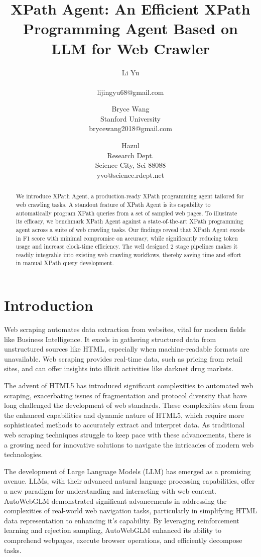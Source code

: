 \documentclass[a4paper]{article}
\title{XPath Agent: An Efficient XPath Programming Agent Based on LLM for Web Crawler}
\author{
Li Yu \\ \\ lijingyu68@gmail.com
\and
Bryce Wang \\ Stanford University  \\ brycewang2018@gmail.com
\and
Hazul \\ Research Dept.\\
                Science City, Sci 88088 \\ yvo@science.rdept.net
}
\begin{document}
\maketitle

\begin{abstract}
We introduce XPath Agent, a production-ready XPath programming agent tailored for web crawling tasks. A standout feature of XPath Agent is its capability to automatically program XPath queries from a set of sampled web pages. To illustrate its efficacy, we benchmark XPath Agent against a state-of-the-art XPath programming agent across a suite of web crawling tasks. Our findings reveal that XPath Agent excels in F1 score with minimal compromise on accuracy, while significantly reducing token usage and increase clock-time efficiency. The well designed 2 stage pipelines makes it readily integrable into existing web crawling workflows, thereby saving time and effort in manual XPath query development.
\end{abstract}

\section{Introduction}

Web scraping \cite{khder2021web} automates data extraction from websites, vital for modern fields like Business Intelligence. It excels in gathering structured data from unstructured sources like HTML, especially when machine-readable formats are unavailable. Web scraping provides real-time data, such as pricing from retail sites, and can offer insights into illicit activities like darknet drug markets.

The advent of HTML5 \cite{TABARES2021101529} has introduced significant complexities to automated web scraping, exacerbating issues of fragmentation and protocol diversity that have long challenged the development of web standards. These complexities stem from the enhanced capabilities and dynamic nature of HTML5, which require more sophisticated methods to accurately extract and interpret data. As traditional web scraping techniques struggle to keep pace with these advancements, there is a growing need for innovative solutions to navigate the intricacies of modern web technologies.

The development of Large Language Models (LLM) has emerged as a promising avenue. LLMs, with their advanced natural language processing capabilities, offer a new paradigm for understanding and interacting with web content. AutoWebGLM\cite{lai2024autowebglmlargelanguagemodelbased} demonstrated significant advancements in addressing the complexities of real-world web navigation tasks, particularly in simplifying HTML data representation to enhancing it's capability. By leveraging reinforcement learning and rejection sampling, AutoWebGLM enhanced its ability to comprehend webpages, execute browser operations, and efficiently decompose tasks.
\end{document}

